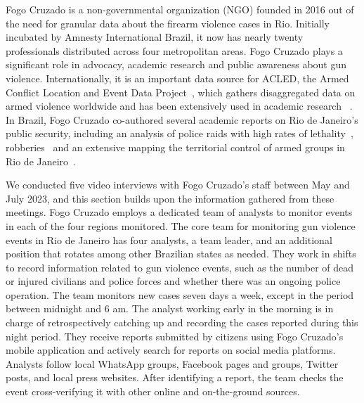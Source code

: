 \documentclass[11pt,letterpaper]{article}
\begin{document}
Fogo Cruzado is a non-governmental organization (NGO) founded in 2016 out of the need for granular data about the firearm violence cases in Rio. Initially incubated by Amnesty International Brazil, it now has nearly twenty professionals distributed across four metropolitan areas. Fogo Cruzado plays a significant role in advocacy, academic research and public awareness about gun violence. Internationally, it is an important data source for ACLED, the Armed Conflict Location and Event Data Project~\citep{raleighIntroducingACLEDArmed2010}, which gathers disaggregated data on armed violence worldwide and has been extensively used in academic research ~\citep{bloem_covid-19_2021,piskorski_new_2020}. In Brazil, Fogo Cruzado co-authored several academic reports on Rio de Janeiro's public security, including an analysis of police raids with high rates of lethality~\citep{hirataChacinasPoliciaisNo2023}, robberies~\citep{hirataRoubosProtecaoPatrimonial2019} and an extensive mapping the territorial control of armed groups in Rio de Janeiro~\citep{hirataMapaHistoricoDos2022}.

We conducted five video interviews with Fogo Cruzado's staff between May and July 2023, and this section builds upon the information gathered from these meetings. Fogo Cruzado employs a dedicated team of analysts to monitor events in each of the four regions monitored. The core team for monitoring gun violence events in Rio de Janeiro has four analysts, a team leader, and an additional position that rotates among other Brazilian states as needed. They work in shifts to record information related to gun violence events, such as the number of dead or injured civilians and police forces and whether there was an ongoing police operation. The team monitors new cases seven days a week, except in the period between midnight and 6 am. The analyst working early in the morning is in charge of retrospectively catching up and recording the cases reported during this night period. They receive reports submitted by citizens using Fogo Cruzado's mobile application and actively search for reports on social media platforms. Analysts follow local WhatsApp groups, Facebook pages and groups, Twitter posts, and local press websites. After identifying a report, the team checks the event cross-verifying it with other online and on-the-ground sources.
\end{document}
